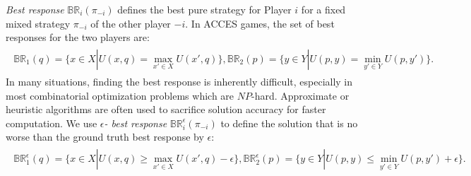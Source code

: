 \textit{Best response} $\mathbb{BR}_i(\pi_{-i})$ defines the best pure strategy for Player $i$ for a fixed mixed strategy $\pi_{-i}$ of the other player $-i$. In ACCES games, the set of best responses for the two players are:
\begin{eqnarray}
    \begin{aligned}
        \mathbb{BR}_1(q) = \{x \in X| U(x, q) = \max_{x' \in X} U(x', q) \},
        \mathbb{BR}_2(p) = \{y \in Y| U(p, y) = \min_{y' \in Y} U(p, y') \}.
    \end{aligned}
\end{eqnarray}
In many situations, finding the best response is inherently difficult, especially in most combinatorial optimization problems which are $NP$-hard. %
Approximate or heuristic algorithms are often used to sacrifice solution accuracy for faster computation. We use \textit{$\epsilon$- best response} $\mathbb{BR}_i^{\epsilon}(\pi_{-i})$ to define the solution that is no worse than the ground truth best response by $\epsilon$:
\begin{eqnarray}
    \begin{aligned}
        \mathbb{BR}_1^{\epsilon}(q) = \{x \in X| U(x, q) \geq \max_{x' \in X} U(x', q) - \epsilon \}, 
        \mathbb{BR}_2^{\epsilon}(p) = \{y \in Y| U(p, y) \leq \min_{y' \in Y} U(p, y') +\epsilon \}.
    \end{aligned}
\end{eqnarray}
